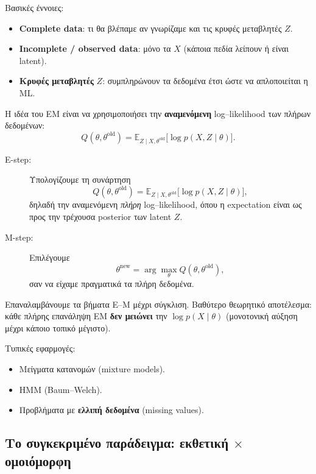 \documentclass[a4paper,11pt]{article}
\begin{document}
Βασικές έννοιες:

\begin{itemize}
  \item \textbf{Complete data}:
        τι θα βλέπαμε αν γνωρίζαμε και τις κρυφές μεταβλητές $Z$.
  \item \textbf{Incomplete / observed data}:
        μόνο τα $X$ (κάποια πεδία λείπουν ή είναι latent).
  \item \textbf{Κρυφές μεταβλητές} $Z$:
        συμπληρώνουν τα δεδομένα έτσι ώστε να απλοποιείται η ML.
\end{itemize}

Η ιδέα του EM είναι να χρησιμοποιήσει την \textbf{αναμενόμενη}
log–likelihood των πλήρων δεδομένων:
\[
Q(\theta,\theta^{\text{old}})
= \mathbb{E}_{Z \mid X,\theta^{\text{old}}}
  \big[ \log p(X,Z \mid \theta) \big].
\]

\begin{description}
  \item[E-step:]
    Υπολογίζουμε τη συνάρτηση
    \[
      Q(\theta,\theta^{\text{old}})
      = \mathbb{E}_{Z \mid X,\theta^{\text{old}}}
        \big[ \log p(X,Z \mid \theta) \big],
    \]
    δηλαδή την αναμενόμενη \emph{πλήρη} log–likelihood,
    όπου η expectation είναι ως προς την τρέχουσα posterior
    των latent $Z$.
  \item[M-step:]
    Επιλέγουμε
    \[
      \theta^{\text{new}} = \arg\max_{\theta} Q(\theta,\theta^{\text{old}}),
    \]
    σαν να είχαμε πραγματικά τα πλήρη δεδομένα.
\end{description}

Επαναλαμβάνουμε τα βήματα E–M μέχρι σύγκλιση. Βαθύτερο θεωρητικό αποτέλεσμα:
κάθε πλήρης επανάληψη EM \textbf{δεν μειώνει} την $\log p(X\mid\theta)$
(μονοτονική αύξηση μέχρι κάποιο τοπικό μέγιστο).

Τυπικές εφαρμογές:
\begin{itemize}
  \item Μείγματα κατανομών (mixture models).
  \item HMM (Baum–Welch).
  \item Προβλήματα με \textbf{ελλιπή δεδομένα} (missing values).
\end{itemize}

\subsection{Το συγκεκριμένο παράδειγμα: εκθετική \texorpdfstring{$\times$}{x} ομοιόμορφη}
\end{document}
